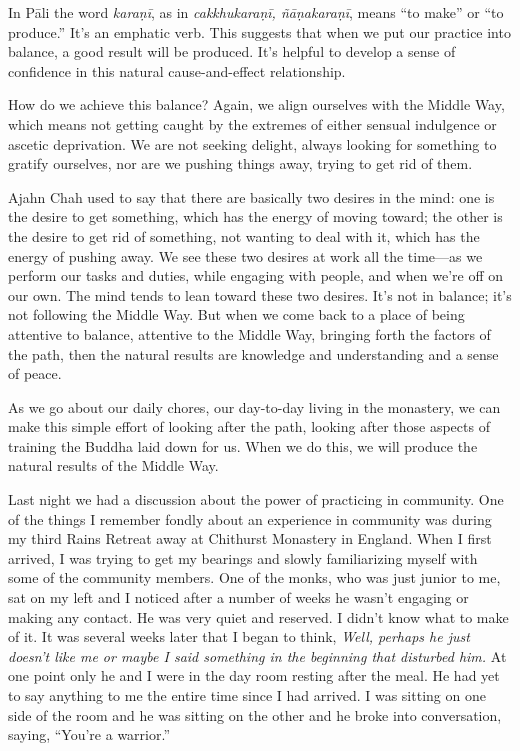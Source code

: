 In Pāli the word \emph{karaṇī}, as in \emph{cakkhukaraṇī, 
ñāṇakaraṇī}, means ``to make'' or ``to produce.'' It's an 
emphatic verb. This suggests that when we put our practice into 
balance, a good result will be produced. It's helpful to develop a 
sense of confidence in this natural cause-and-effect relationship.

How do we achieve this balance? Again, we align ourselves with the 
Middle Way, which means not getting caught by the extremes of either 
sensual indulgence or ascetic deprivation. We are not seeking delight, 
always looking for something to gratify ourselves, nor are we pushing 
things away, trying to get rid of them.

Ajahn Chah used to say that there are basically two desires in the 
mind: one is the desire to get something, which has the energy of 
moving toward; the other is the desire to get rid of something, not 
wanting to deal with it, which has the energy of pushing away. We see 
these two desires at work all the time---as we perform our tasks and 
duties, while engaging with people, and when we're off on our own. The 
mind tends to lean toward these two desires. It's not in balance; it's 
not following the Middle Way. But when we come back to a place of being 
attentive to balance, attentive to the Middle Way, bringing forth the 
factors of the path, then the natural results are knowledge and 
understanding and a sense of peace.

As we go about our daily chores, our day-to-day living in the 
monastery, we can make this simple effort of looking after the path, 
looking after those aspects of training the Buddha laid down for us. 
When we do this, we will produce the natural results of the Middle Way.


Last night we had a discussion about the power of practicing in 
community. One of the things I remember fondly about an experience in 
community was during my third Rains Retreat away at Chithurst Monastery 
in England. When I first arrived, I was trying to get my bearings and 
slowly familiarizing myself with some of the community members. One of 
the monks, who was just junior to me, sat on my left and I noticed 
after a number of weeks he wasn't engaging or making any contact. He 
was very quiet and reserved. I didn't know what to make of it. It was 
several weeks later that I began to think, \emph{Well, perhaps he just 
doesn't like me or maybe I said something in the beginning that 
disturbed him.} At one point only he and I were in the day room resting 
after the meal. He had yet to say anything to me the entire time since 
I had arrived. I was sitting on one side of the room and he was sitting 
on the other and he broke into conversation, saying, ``You're a 
warrior.''

